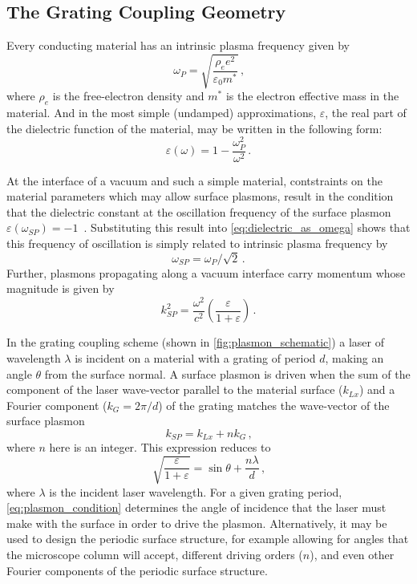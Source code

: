 \subsection{The Grating Coupling Geometry}

Every conducting material has an intrinsic plasma frequency given by 
\begin{equation}
  \omega_{P} = \sqrt{\frac{\rho_{e} e^2}{\varepsilon_{0} m^*}} \,\text{,}
\end{equation}
where $\rho_{e}$ is the free-electron density and $m^*$ is the electron effective mass in the material.
And in the most simple (undamped) approximations, $\varepsilon$, the real part of the dielectric function of the material, may be written in the following form:
\begin{equation} \label{eq:dielectric_as_omega}
  \varepsilon(\omega) = 1 - \frac{ \omega_{P}^2 }{ \omega^2 } \,\text{.}
\end{equation}

At the interface of a vacuum and such a simple material, contstraints on the material parameters which may allow surface plasmons, result in the condition that the dielectric constant at the oscillation frequency of the surface plasmon $ \varepsilon(\omega_{SP}) = -1 $~\cite{cottam_introduction_2004}.
Substituting this result into \ref{eq:dielectric_as_omega} shows that this frequency of oscillation is simply related to intrinsic plasma frequency by
\begin{equation}
  \omega_{SP} = \omega_{P} / \sqrt{2} \,\text{.}
\end{equation}
Further, plasmons propagating along a vacuum interface carry momentum whose magnitude is given by 
\begin{equation}
  k_{SP}^2 = \frac{\omega^2}{c^2} \left( \frac{ \varepsilon }{ 1 + \varepsilon } \right) \,\text{.}
\end{equation}

In the grating coupling scheme (shown in \ref{fig:plasmon_schematic}) a laser of wavelength $\lambda$ is incident on a material with a grating of period $d$, making an angle $\theta$ from the surface normal.
A surface plasmon is driven when the sum of the component of the laser wave-vector parallel to the material surface ($k_{Lx}$) and a Fourier component ($k_{G} = 2 \pi / d$) of the grating matches the wave-vector of the surface plasmon
\begin{equation}
  k_{SP} = k_{Lx} + n k_{G} \,\text{,}
\end{equation}
where $n$ here is an integer.
This expression reduces to 
\begin{equation} \label{eq:plasmon_condition}
  \sqrt{ \frac{ \varepsilon }{ 1 + \varepsilon } } = \sin \theta + \frac{ n \lambda }{ d } \,\text{,}
\end{equation}
where $\lambda$ is the incident laser wavelength.
For a given grating period, \ref{eq:plasmon_condition} determines the angle of incidence that the laser must make with the surface in order to drive the plasmon.
Alternatively, it may be used to design the periodic surface structure, for example allowing for angles that the microscope column will accept, different driving orders ($n$), and even other Fourier components of the periodic surface structure.

